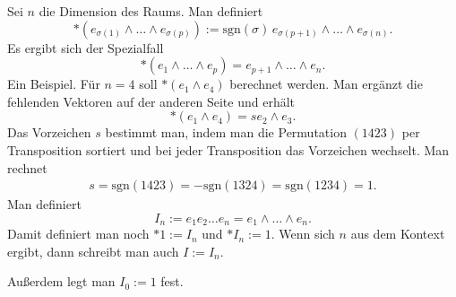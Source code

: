 \documentclass[a4paper,10pt,fleqn,twocolumn,twoside]{article}
\numberwithin{equation}{section}
\begin{document}
Sei $n$ die Dimension des Raums. Man definiert
\[*(e_{\sigma(1)}\wedge\ldots\wedge e_{\sigma(p)})
:= \mathrm{sgn}(\sigma)\,e_{\sigma(p+1)}\wedge\ldots\wedge e_{\sigma(n)}.\]
Es ergibt sich der Spezialfall
\begin{equation}
*(e_1\wedge\ldots\wedge e_p) = e_{p+1}\wedge\ldots\wedge e_n.
\end{equation}
Ein Beispiel. Für $n=4$ soll $*(e_1\wedge e_4)$
berechnet werden. Man ergänzt die fehlenden Vektoren
auf der anderen Seite und erhält
\begin{equation}
*(e_1\wedge e_4) = se_2\wedge e_3.
\end{equation}
Das Vorzeichen $s$ bestimmt man, indem man die Permutation
$(1423)$ per Transposition sortiert und bei jeder Transposition
das Vorzeichen wechselt. Man rechnet
\begin{gather*}
s = \mathrm{sgn}(1423)=-\mathrm{sgn}(1324) = \mathrm{sgn}(1234) = 1.
\end{gather*}
Man definiert
\begin{equation}
I_n := e_1e_2\ldots e_n = e_1\wedge\ldots\wedge e_n.
\end{equation}
Damit definiert man noch $*1:=I_n$ und $*I_n:=1$.
Wenn sich $n$ aus dem Kontext ergibt, dann schreibt man auch $I:=I_n$.

Außerdem legt man $I_0:=1$ fest.
\end{document}
